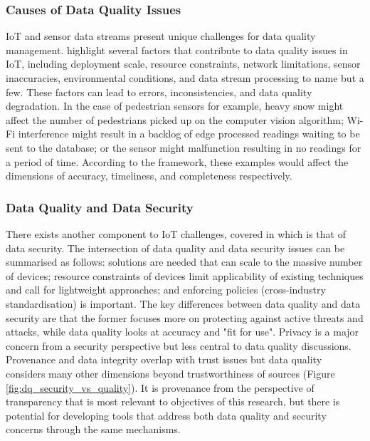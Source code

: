 \subsubsection{Causes of Data Quality Issues}
IoT and sensor data streams present unique challenges for data quality management. \cite{karkouchDataQualityInternet2016} highlight several factors that contribute to data quality issues in IoT, including deployment scale, resource constraints, network limitations, sensor inaccuracies, environmental conditions, and data stream processing to name but a few. These factors can lead to errors, inconsistencies, and data quality degradation. In the case of pedestrian sensors for example, heavy snow might affect the number of pedestrians picked up on the computer vision algorithm; Wi-Fi interference might result in a backlog of edge processed readings waiting to be sent to the database; or the sensor might malfunction resulting in no readings for a period of time. According to the \cite{karkouchDataQualityInternet2016} framework, these examples would affect the dimensions of accuracy, timeliness, and completeness respectively.

\subsubsection{Data Quality and Data Security}
There exists another component to IoT challenges, covered in \cite{sicariSecurityandQualityawareSystem2016} which is that of data security. The intersection of data quality and data security issues can be summarised as follows: solutions are needed that can scale to the massive number of devices; resource constraints of devices limit applicability of existing techniques and call for lightweight approaches; and enforcing policies (cross-industry standardisation) is important. The key differences between data quality and data security are that the former focuses more on protecting against active threats and attacks, while data quality looks at accuracy and "fit for use". Privacy is a major concern from a security perspective but less central to data quality discussions. Provenance and data integrity overlap with trust issues but data quality considers many other dimensions beyond trustworthiness of sources (Figure \ref{fig:dq_security_vs_quality}). It is provenance from the perspective of transparency that is most relevant to objectives of this research, but there is potential for developing tools that address both data quality and security concerns through the same mechanisms.


